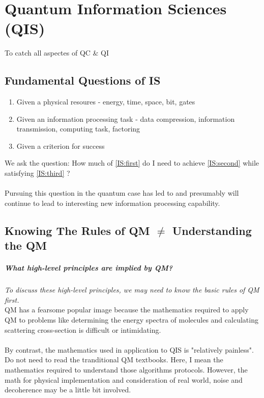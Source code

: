 \documentclass[]{book}
\theoremstyle{nonumberplain}
\begin{document}
\chapter{Quantum Information Sciences (QIS)}%
\label{sec:quantum_information_sciences}
To catch all aspectes of QC \& QI
\section*{Fundamental Questions of IS}
\begin{enumerate}
	\item \label{IS:first} Given a physical resoures - energy, time, space, bit, gates
	\item \label{IS:second} Given an information processing task - data compression, information transmission, computing task, factoring
	\item \label{IS:third} Given a criterion for success
\end{enumerate}
We ask the question: How much of \ref{IS:first} do I need to achieve \ref{IS:second} while satisfying \ref{IS:third} ?
\\
\\
Pursuing this question in the quantum case has led to and presumably will continue to lead to interesting new information processing capability.
\section*{Knowing The Rules of QM $\neq$ Understanding the QM}
\paragraph{What high-level principles are implied by QM?}
\textit{To discuss these high-level principles, we may need to know the basic rules of QM first.}\\
QM has a fearsome popular image because the mathematics required to apply QM to problems like determining the energy spectra of molecules and calculating scattering cross-section is difficult or intimidating.\\
\\
By contrast, the mathematics used in application to QIS is "relatively painless". Do not need to read the tranditional QM textbooks. Here, I mean the mathematics required to understand those algorithms protocols. However, the math for physical implementation and consideration of real world, noise and decoherence may be a little bit involved.\\
\end{document}
